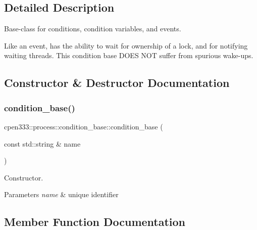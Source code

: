 \subsection{Detailed Description}
Base-\/class for conditions, condition variables, and events. 

Like an event, has the ability to wait for ownership of a lock, and for notifying waiting threads. This condition base D\+O\+ES N\+OT suffer from spurious wake-\/ups. 

\subsection{Constructor \& Destructor Documentation}
\mbox{\label{classcpen333_1_1process_1_1condition__base_a23384ba303cc2111cc4272830ae9f72b}} 
\subsubsection{\texorpdfstring{condition\+\_\+base()}{condition\_base()}}
{\footnotesize\ttfamily cpen333\+::process\+::condition\+\_\+base\+::condition\+\_\+base (\begin{DoxyParamCaption}\item[{const std\+::string \&}]{name }\end{DoxyParamCaption})\hspace{0.3cm}{\ttfamily [inline]}}



Constructor. 


\begin{DoxyParams}{Parameters}
{\em name} & unique identifier \\
\hline
\end{DoxyParams}


\subsection{Member Function Documentation}
\mbox{\label{classcpen333_1_1process_1_1condition__base_af6f7110f5be9935ac2fbea2b303a2903}} 
